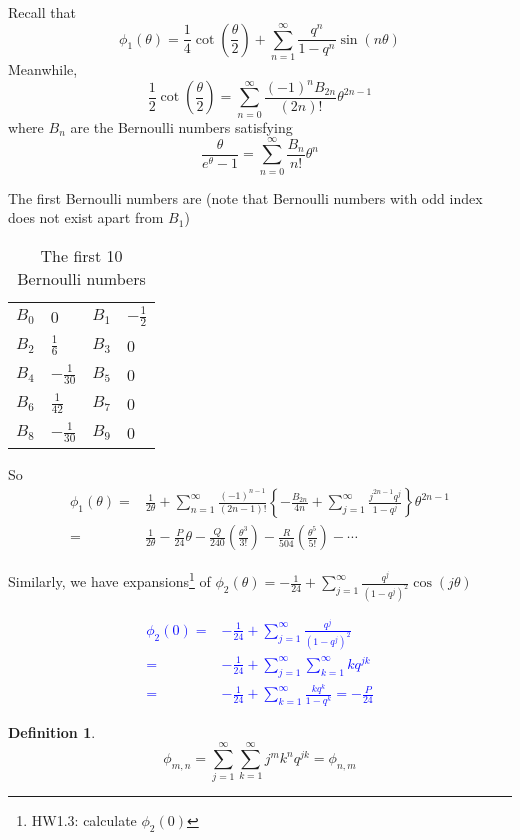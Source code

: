 \documentclass{article}
\newtheorem{Def}{Definition}[section]
\begin{document}
Recall that \[\phi_1(\theta) = \frac{1}{4} \cot(\frac{\theta}{2}) + \sum\limits_{n=1}^{\infty} \frac{q^n}{1-q^n} \sin(n\theta)\]
Meanwhile, \[\frac{1}{2} \cot(\frac{\theta}{2}) = \sum\limits_{n=0}^{\infty} \frac{(-1)^nB_{2n}}{(2n)!}\theta^{2n-1}\]
where $B_n$ are the Bernoulli numbers satisfying
\[\frac{\theta}{e^{\theta}-1} = \sum\limits_{n=0}^{\infty} \frac{B_n}{n!}\theta^{n}\]

The first Bernoulli numbers are (note that Bernoulli numbers with odd index does not exist apart from $B_1$)

\begin{table}
  \centering
  \caption{The first 10 Bernoulli numbers}
\begin{tabular}{ll|ll}
$B_0$ & 0               & $B_1$ & $-\frac{1}{2}$ \\
$B_2$ & $\frac{1}{6}$   & $B_3$ & 0              \\
$B_4$ & $-\frac{1}{30}$  & $B_5$ & 0              \\
$B_6$ & $\frac{1}{42}$  & $B_7$ & 0              \\
$B_8$ & $-\frac{1}{30}$ & $B_9$ & 0             
\end{tabular}
\end{table}

So
\begin{align*}
 \phi_1(\theta) =& \frac{1}{2\theta} + \sum\limits_{n=1}^{\infty} \frac{(-1)^{n-1}}{(2n-1)!} \left\{ -\frac{B_{2n}}{4n} + \sum\limits_{j=1}^{\infty} \frac{j^{2n-1}q^j}{1-q^j} \right\}\theta^{2n-1} \\
 = & \frac{1}{2\theta} -\frac{P}{24}\theta - \frac{Q}{240} \left( \frac{\theta^3}{3!} \right) - \frac{R}{504} \left( \frac{\theta^5}{5!} \right) - \cdots
\end{align*}

Similarly, we have expansions\footnote{HW1.3: calculate $\phi_2(0)$} of 
$\phi_2(\theta)=-\frac{1}{24} + \sum\limits_{j=1}^{\infty} \frac{q^j}{(1-q^j)^2}\cos(j\theta)$

\textcolor{blue}{
\begin{align*}
 \phi_2(0)= & -\frac{1}{24} + \sum\limits_{j=1}^{\infty} \frac{q^j}{(1-q^j)^2} \\
 = & -\frac{1}{24} + \sum\limits_{j=1}^{\infty} \sum\limits_{k=1}^{\infty} kq^{jk}\\
 = & -\frac{1}{24} + \sum\limits_{k=1}^{\infty} \frac{kq^k}{1-q^k} = -\frac{P}{24}
\end{align*}
}

\begin{Def}
\[\phi_{m,n}= \sum\limits_{j=1}^{\infty} \sum\limits_{k=1}^{\infty} j^m k^n q^{jk} = \phi_{n,m}\]  
\end{Def}
\end{document}
